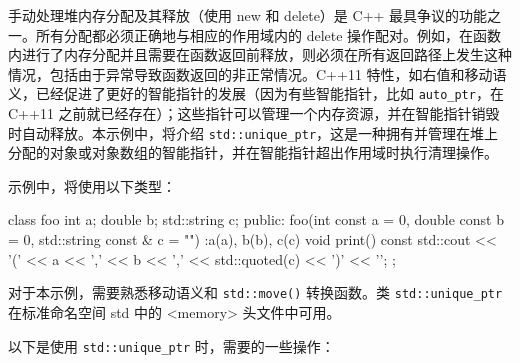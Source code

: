 手动处理堆内存分配及其释放（使用 new 和 delete）是 C++ 最具争议的功能之一。所有分配都必须正确地与相应的作用域内的 delete 操作配对。例如，在函数内进行了内存分配并且需要在函数返回前释放，则必须在所有返回路径上发生这种情况，包括由于异常导致函数返回的非正常情况。C++11 特性，如右值和移动语义，已经促进了更好的智能指针的发展（因为有些智能指针，比如 \verb|auto_ptr|，在 C++11 之前就已经存在）；这些指针可以管理一个内存资源，并在智能指针销毁时自动释放。本示例中，将介绍 \verb|std::unique_ptr|，这是一种拥有并管理在堆上分配的对象或对象数组的智能指针，并在智能指针超出作用域时执行清理操作。


示例中，将使用以下类型：

\begin{cpp}
class foo
{
    int a;
    double b;
    std::string c;
public:
    foo(int const a = 0, double const b = 0,
    std::string const & c = "") :a(a), b(b), c(c)
    {}
    void print() const
    {
        std::cout << '(' << a << ',' << b << ',' << std::quoted(c) << ')'
        << '\n';
    }
};
\end{cpp}

对于本示例，需要熟悉移动语义和 \verb|std::move()| 转换函数。类 \verb|std::unique_ptr| 在标准命名空间 std 中的 <memory> 头文件中可用。


以下是使用 \verb|std::unique_ptr| 时，需要的一些操作：

